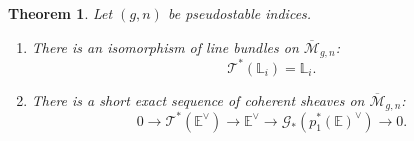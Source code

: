 \documentclass[12pt]{amsart}
\newtheorem{theorem}[equation]{Theorem}
\theoremstyle{definition}
\newtheorem{remark}[equation]{Remark}
\newcommand{\M}{\overline{\mathcal{M}}}
\newcommand{\T}{\mathcal{T}}
\newcommand{\bE}{\mathbb{E}}
\newcommand{\G}{\mathcal{G}}
\renewcommand{\O}{\mathcal{O}}
\newcommand{\C}{\mathcal{C}}
\renewcommand{\L}{\mathbb{L}}
\numberwithin{equation}{section}
\begin{document}
\begin{theorem}\label{thm:comparingbundles}
Let $(g,n)$ be  pseudostable indices.
\begin{enumerate}
\item[(i)] There is an isomorphism of line bundles on $\M_{g,n}$:
\[
\T^*(\L_i)=\L_i.
\]
\item[(ii)] There is a short exact sequence of coherent sheaves on $\M_{g,n}$:
\[
0\longrightarrow \T^*(\bE^\vee) \longrightarrow\bE^\vee\longrightarrow \G_*(p_1^*(\bE)^\vee) \longrightarrow 0.
\]
\end{enumerate}
\end{theorem}

%
\end{document}
